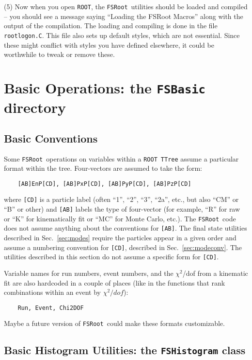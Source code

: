 \documentclass[11pt]{article}
\newcommand{\FSR}{{\tt FSRoot}}
\newcommand{\ROOT}{{\tt ROOT}}
\begin{document}
(5) Now when you open \ROOT, the \FSR\ utilities should be loaded and compiled -- you should see a message saying ``Loading the FSRoot Macros'' along with the output of the compilation.  The loading and compiling is done in the file {\tt rootlogon.C}.  This file also sets up default styles, which are not essential.  Since these might conflict with styles you have defined elsewhere, it could be worthwhile to tweak or remove these.

\section{Basic Operations:  the {\tt FSBasic} directory}

\subsection{Basic Conventions}
\label{sec:conventions}

Some \FSR\ operations on variables within a \ROOT\ {\tt TTree} assume a particular format within the tree.  Four-vectors are assumed to take the form:
\begin{verbatim}
    [AB]EnP[CD], [AB]PxP[CD], [AB]PyP[CD], [AB]PzP[CD]
\end{verbatim}
where {\tt [CD]} is a particle label (often ``1'', ``2'', ``3'', ``2a'', etc., but also ``CM'' or ``B'' or other) and {\tt [AB]} labels the type of four-vector (for example, ``R'' for raw or ``K'' for kinematically fit or ``MC'' for Monte Carlo, etc.).  The \FSR\ code does not assume anything about the conventions for {\tt [AB]}.  The final state utilities described in Sec.~\ref{sec:modes} require the particles appear in a given order and assume a numbering convention for {\tt [CD]}, described in Sec.~\ref{sec:modeconv}.  The utilities described in this section do not assume a specific form for {\tt [CD]}.

Variable names for run numbers, event numbers, and the $\chi^2$/dof from a kinematic fit are also hardcoded in a couple of places (like in the functions that rank combinations within an event by $\chi^2/dof$):
\begin{verbatim}
    Run, Event, Chi2DOF
\end{verbatim}
Maybe a future version of \FSR\ could make these formats customizable.


\subsection{Basic Histogram Utilities: the {\tt FSHistogram} class}
\label{sec:hist}
\end{document}
